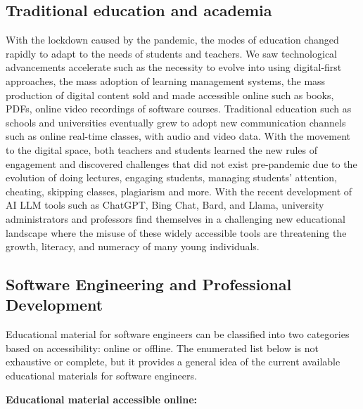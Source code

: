 \documentclass[journal, onecolumn]{IEEEtran}
\begin{document}
\subsection{Traditional education and academia}
With the lockdown caused by the pandemic, the modes of education changed rapidly to 
adapt to the needs of students and teachers. We saw technological advancements 
accelerate such as the necessity to evolve into using digital-first approaches, the
mass adoption of learning management systems, the mass production of digital content 
sold and made accessible online such as books, PDFs, online video recordings of 
software courses. 
Traditional education such as schools and universities eventually grew to adopt 
new communication channels such as online real-time classes, with audio and video data. 
With the movement to the digital space, both teachers and students learned the new 
rules of engagement and discovered challenges that did not exist pre-pandemic due to
the evolution of doing lectures, engaging students, managing students' attention, 
cheating, skipping classes, plagiarism and more.
With the recent development of AI LLM tools such as ChatGPT, Bing Chat, Bard, and 
Llama, university administrators and professors find themselves in a challenging
new educational landscape where the misuse of these widely accessible tools are 
threatening the growth, literacy, and numeracy of many young individuals.

\subsection{Software Engineering and Professional Development}

Educational material for software engineers can be classified into two categories
 based on accessibility: online or offline. The enumerated list below is not exhaustive or complete, 
 but it provides a general idea of the current available educational materials for software engineers.

\textbf{Educational material accessible online:}
\end{document}
